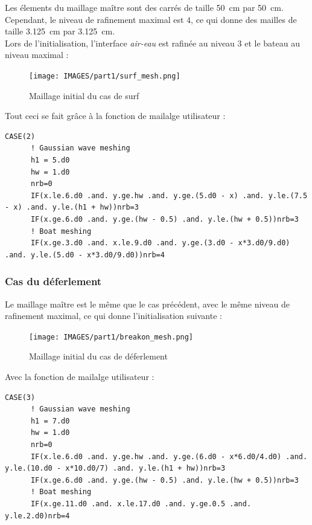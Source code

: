 \documentclass[../main.tex]{subfiles}
\begin{document}
Les élements du maillage maître sont des carrés de taille \qty{50}{\cm} par \qty{50}{\cm}. Cependant, le niveau de rafinement maximal est $4$, ce qui donne des mailles de taille \qty{3.125}{\cm} par \qty{3.125}{\cm}.\\
Lors de l'initialisation, l'interface \textit{air-eau} est rafinée au niveau $3$ et le bateau au niveau maximal :
\begin{figure}[H]
    \centering
    \texttt{[image: IMAGES/part1/surf\_mesh.png]}
    \caption{Maillage initial du cas de surf}
\end{figure}

Tout ceci se fait grâce à la fonction de mailalge utilisateur :
\begin{lstlisting}[style=f90, caption={Maillge utilisateur pour le cas de \textit{surf}}, captionpos=b]
    CASE(2)
      ! Gaussian wave meshing
      h1 = 5.d0
      hw = 1.d0
      nrb=0
      IF(x.le.6.d0 .and. y.ge.hw .and. y.ge.(5.d0 - x) .and. y.le.(7.5 - x) .and. y.le.(h1 + hw))nrb=3
      IF(x.ge.6.d0 .and. y.ge.(hw - 0.5) .and. y.le.(hw + 0.5))nrb=3
      ! Boat meshing
      IF(x.ge.3.d0 .and. x.le.9.d0 .and. y.ge.(3.d0 - x*3.d0/9.d0) .and. y.le.(5.d0 - x*3.d0/9.d0))nrb=4
\end{lstlisting}

\newpage
\subsubsection{Cas du déferlement}
Le maillage maître est le même que le cas précédent, avec le même niveau de rafinement maximal, ce qui donne l'initialisation suivante :
\begin{figure}[H]
    \centering
    \texttt{[image: IMAGES/part1/breakon\_mesh.png]}
    \caption{Maillage initial du cas de déferlement}
\end{figure}

Avec la fonction de mailalge utilisateur :
\begin{lstlisting}[style=f90, caption={Maillage utilisateur pour le cas de déferlement}, captionpos=b]
    CASE(3)
      ! Gaussian wave meshing
      h1 = 7.d0
      hw = 1.d0
      nrb=0
      IF(x.le.6.d0 .and. y.ge.hw .and. y.ge.(6.d0 - x*6.d0/4.d0) .and. y.le.(10.d0 - x*10.d0/7) .and. y.le.(h1 + hw))nrb=3
      IF(x.ge.6.d0 .and. y.ge.(hw - 0.5) .and. y.le.(hw + 0.5))nrb=3
      ! Boat meshing
      IF(x.ge.11.d0 .and. x.le.17.d0 .and. y.ge.0.5 .and. y.le.2.d0)nrb=4
\end{lstlisting}
\end{document}
